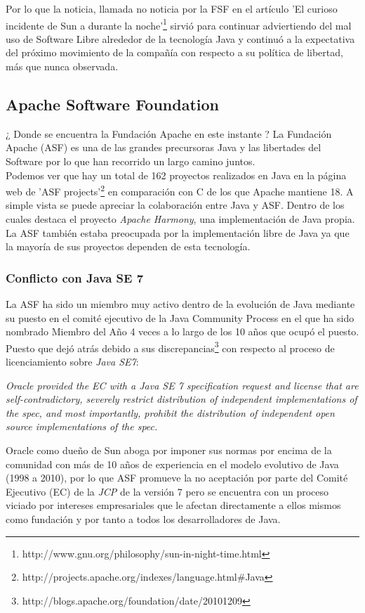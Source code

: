 \documentclass[11pt]{scrartcl}
\begin{document}
Por lo que la noticia, llamada no noticia por la FSF en el artículo 'El curioso incidente de Sun a durante la noche'\footnote{http://www.gnu.org/philosophy/sun-in-night-time.html} sirvió para continuar adviertiendo del mal uso de Software Libre alrededor de la tecnología Java y continuó a la expectativa del próximo movimiento de la compañía con respecto a su política de libertad, más que nunca observada.

\subsection{Apache Software Foundation}

¿ Donde se encuentra la Fundación Apache en este instante ? La Fundación Apache (ASF) es una de las grandes precursoras Java y las libertades del Software por lo que han recorrido un largo camino juntos.\\
Podemos ver que hay un total de 162 proyectos realizados en Java en la página web de 'ASF projects'\footnote{http://projects.apache.org/indexes/language.html\#Java} en comparación con C de los que Apache mantiene 18. A simple vista se puede apreciar la colaboración entre Java y ASF. Dentro de los cuales destaca el proyecto \emph{Apache Harmony}, una implementación de Java propia. La ASF también estaba preocupada por la implementación libre de Java ya que la mayoría de sus proyectos dependen de esta tecnología.

\subsubsection{Conflicto con Java SE 7}

La ASF ha sido un miembro muy activo dentro de la evolución de Java mediante su puesto en el comité ejecutivo de la Java Community Process en el que ha sido nombrado Miembro del Año 4 veces a lo largo de los 10 años que ocupó el puesto. Puesto que dejó atrás debido a sus discrepancias\footnote{http://blogs.apache.org/foundation/date/20101209} con respecto al proceso de licenciamiento sobre \emph{Java SE7}:

    \emph{Oracle provided the EC with a Java SE 7 specification request and license that are self-contradictory, severely restrict distribution of independent implementations of the spec, and most importantly, prohibit the distribution of independent open source implementations of the spec.}
    
Oracle como dueño de Sun aboga por imponer sus normas por encima de la comunidad con más de 10 años de experiencia en el modelo evolutivo de Java (1998 a 2010), por lo que ASF promueve la no aceptación por parte del Comité Ejecutivo (EC) de la \emph{JCP} de la versión 7 pero se encuentra con un proceso viciado por intereses empresariales que le afectan directamente a ellos mismos como fundación y por tanto a todos los desarrolladores de Java.
\end{document}

